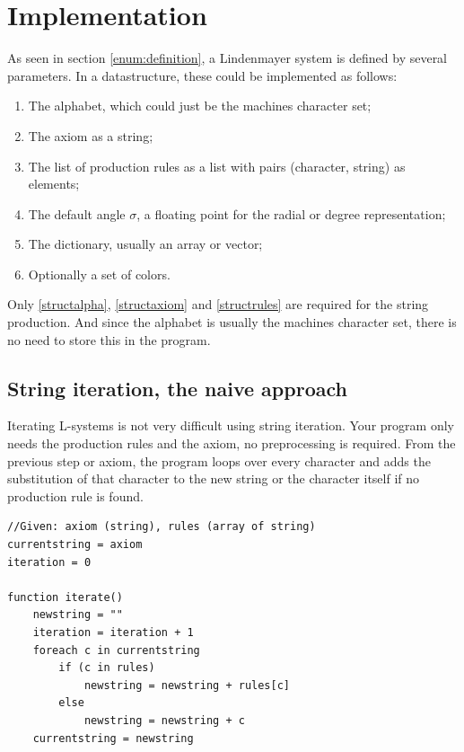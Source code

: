 \documentclass[11pt,a4paper]{article}
\begin{document}
\newpage
\section{Implementation}

As seen in section \ref{enum:definition}, a Lindenmayer system is defined by several parameters. In a datastructure, these could be implemented as follows:
\begin{enumerate}
\item The alphabet, which could just be the machines character set; \label{structalpha}
\item The axiom as a string; \label{structaxiom}
\item The list of production rules as a list with pairs (character, string) as elements; \label{structrules}
\item The default angle $\sigma$, a floating point for the radial or degree representation;
\item The dictionary, usually an array or vector;
\item Optionally a set of colors.
\end{enumerate}
Only \ref{structalpha}, \ref{structaxiom} and \ref{structrules} are required for the string production. And since the alphabet is usually the machines character set, there is no need to store this in the program.

\subsection{String iteration, the naive approach}

Iterating L-systems is not very difficult using string iteration. Your program only needs the production rules and the axiom, no preprocessing is required. From the previous step or axiom, the program loops over every character and adds the substitution of that character to the new string or the character itself if no production rule is found.

\lstset{label=code:stringit,caption=String iteration}
\begin{lstlisting}
//Given: axiom (string), rules (array of string)
currentstring = axiom
iteration = 0

function iterate()
	newstring = ""
	iteration = iteration + 1
	foreach c in currentstring
		if (c in rules)
			newstring = newstring + rules[c]
		else
			newstring = newstring + c
	currentstring = newstring
\end{lstlisting}
\end{document}
